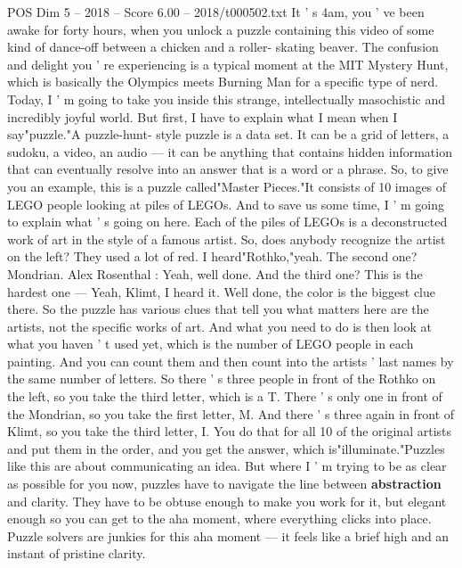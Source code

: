 \begin{textsample}{POS Dim 5 – 2018 – Score 6.00 – 2018/t000502.txt}  \label{ex:f5_pos_066}
It ' s 4am, you ' ve been awake for forty hours, when you unlock a puzzle containing this video of some kind of dance-off between a chicken and a roller- skating beaver.
The confusion and delight you ' re experiencing is a typical moment at the MIT Mystery Hunt, which is basically the Olympics meets Burning Man for a specific type of nerd.
Today, I ' m going to take you inside this strange, intellectually masochistic and incredibly joyful world.
But first, I have to explain what I mean when I say"puzzle."A puzzle-hunt- style puzzle is a data set.
It can be a grid of letters, a sudoku, a video, an audio — it can be anything that contains hidden information that can eventually resolve into an answer that is a word or a phrase.
So, to give you an example, this is a puzzle called"Master Pieces."It consists of 10 images of LEGO people looking at piles of LEGOs.
And to save us some time, I ' m going to explain what ' s going on here.
Each of the piles of LEGOs is a deconstructed work of art in the style of a famous artist.
So, does anybody recognize the artist on the left?
They used a lot of red.
I heard"Rothko,"yeah.
The second one?
Mondrian.
Alex Rosenthal : Yeah, well done.
And the third one?
This is the hardest one — Yeah, Klimt, I heard it.
Well done, the color is the biggest clue there.
So the puzzle has various clues that tell you what matters here are the artists, not the specific works of art.
And what you need to do is then look at what you haven ' t used yet, which is the number of LEGO people in each painting.
And you can count them and then count into the artists ' last names by the same number of letters.
So there ' s three people in front of the Rothko on the left, so you take the third letter, which is a T.
There ' s only one in front of the Mondrian, so you take the first letter, M.
And there ' s three again in front of Klimt, so you take the third letter, I.
You do that for all 10 of the original artists and put them in the order, and you get the answer, which is"illuminate."Puzzles like this are about communicating an idea.
But where I ' m trying to be as clear as possible for you now, puzzles have to navigate the line between \textbf{abstraction} and clarity.
They have to be obtuse enough to make you work for it, but elegant enough so you can get to the aha moment, where everything clicks into place.
Puzzle solvers are junkies for this aha moment — it feels like a brief high and an instant of pristine clarity.

\end{textsample}
